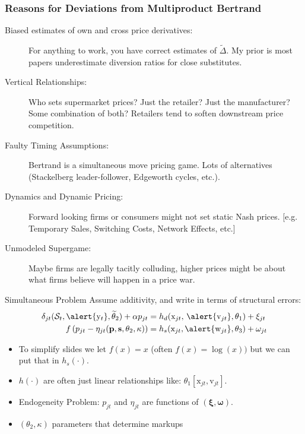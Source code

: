 \begin{frame}
\frametitle{Reasons for Deviations from Multiproduct Bertrand}
\small
\begin{description}
\item[Biased estimates of own and cross price derivatives:] For anything to work, you have correct estimates of $\tilde{\Delta}$. My prior is most papers \alert{underestimate} diversion ratios for close substitutes.
\item[Vertical Relationships:] Who sets supermarket prices? Just the retailer? Just the manufacturer? Some combination of both? Retailers tend to \alert{soften} downstream price competition.
\item[Faulty Timing Assumptions:] Bertrand is a simultaneous move pricing game. Lots of alternatives (Stackelberg leader-follower, Edgeworth cycles, etc.).
\item[Dynamics and Dynamic Pricing:] Forward looking firms or consumers might not set static Nash prices. [e.g. Temporary Sales, Switching Costs, Network Effects, etc.]
\item[Unmodeled Supergame:] Maybe firms are legally tacitly colluding, higher prices might be about what firms believe will happen in a price war.
\end{description}
\end{frame}


\begin{frame}{Simultaneous Problem}
Assume additivity, and write in terms of structural errors:
\begin{align*}
\delta_{jt}(\mathcal{S}_t,\alert{\mathrm{y}_t}, \widetilde{\theta}_2) + \alpha p_{jt} &= h_d(\textrm{x}_{jt}, \, \alert{\textrm{v}_{jt}},\theta_1)  + \xi_{jt} \\
 f \left( p_{jt} - \eta_{jt}(\mathbf{p},\mathbf{s},\theta_2,\kappa) \right) &= h_s(\textrm{x}_{jt}, \alert{\textrm{w}_{jt}},\theta_3) + \omega_{jt}
\end{align*}
\vspace{-.4cm}
\begin{itemize}
 \item To simplify slides we let $f(x)=x$ (often $f(x) =\log(x))$ but we can put that in $h_s(\cdot)$.
\item $h(\cdot)$ are often just linear relationships like: $\theta_1 [\textrm{x}_{jt}, \textrm{v}_{jt}]$.
\item Endogeneity Problem: $p_{jt}$ and $\eta_{jt}$ are functions of $(\boldsymbol{\xi},\boldsymbol{\omega})$.
\item $(\theta_2, \kappa)$ parameters that determine markups
\end{itemize}
\end{frame}

